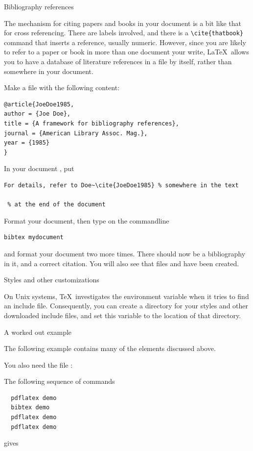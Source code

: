  {Bibliography references}
\label{sec:bib-latex}

The mechanism for citing papers and books in your document is a bit
like that for cross referencing. There are labels involved, and there
is a \verb+\cite{thatbook}+ command that inserts a reference, usually
numeric. However, since you are likely to refer to a paper or book in
more than one document your write, \LaTeX\ allows you to have a
database of literature references in a file by itself,
rather than somewhere in your document.

Make a file  with the following content:
\begin{verbatim}
@article{JoeDoe1985,
author = {Joe Doe},
title = {A framework for bibliography references},
journal = {American Library Assoc. Mag.},
year = {1985}
}
\end{verbatim}
In your document , put
\begin{verbatim}
For details, refer to Doe~\cite{JoeDoe1985} % somewhere in the text

 % at the end of the document

\end{verbatim}
Format your document, then type on the commandline
\begin{verbatim}
bibtex mydocument
\end{verbatim}
and format your document two more times. There should now be a
bibliography in it, and a correct citation. You will also see that
files  and  have been created.

 {Styles and other customizations}
\label{sec:texinputs}

On Unix systems, \TeX\ investigates the  environment
variable when it tries to find an include file. Consequently, you can
create a directory for your styles and other downloaded include files,
and set this variable to the location of that directory.

 {A worked out example}

The following example  contains many of the elements discussed above.

\begingroup\small

\endgroup

You also need the file :

\begingroup\small

\endgroup

The following sequence of commands
\begin{verbatim}
  pdflatex demo
  bibtex demo
  pdflatex demo
  pdflatex demo
\end{verbatim}
gives 

